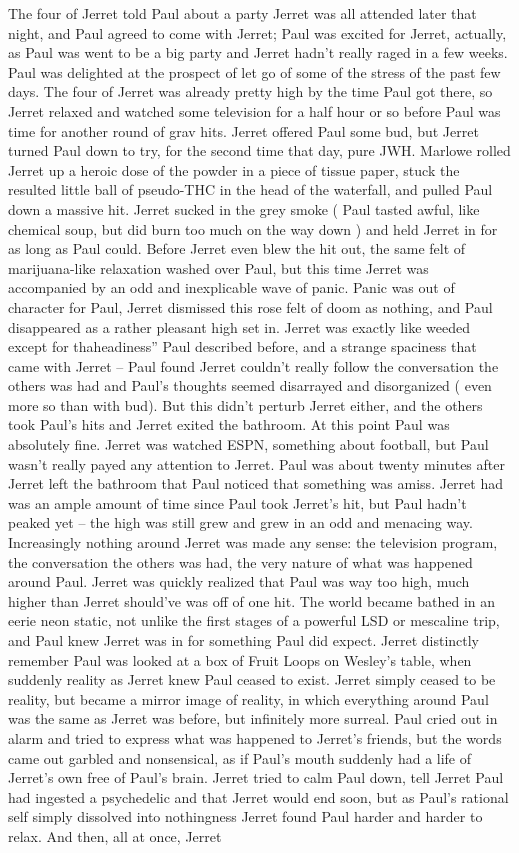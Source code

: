 \documentclass[12pt]{book}
\begin{document}
The four of Jerret told Paul about a party Jerret was all attended later that night, and Paul agreed to come with Jerret; Paul was excited for Jerret, actually, as Paul was went to be a big party and Jerret hadn't really raged in a few weeks. Paul was delighted at the prospect of let go of some of the stress of the past few days. The four of Jerret was already pretty high by the time Paul got there, so Jerret relaxed and watched some television for a half hour or so before Paul was time for another round of grav hits. Jerret offered Paul some bud, but Jerret turned Paul down to try, for the second time that day, pure JWH. Marlowe rolled Jerret up a heroic dose of the powder in a piece of tissue paper, stuck the resulted little ball of pseudo-THC in the head of the waterfall, and pulled Paul down a massive hit. Jerret sucked in the grey smoke ( Paul tasted awful, like chemical soup, but did burn too much on the way down ) and held Jerret in for as long as Paul could. Before Jerret even blew the hit out, the same felt of marijuana-like relaxation washed over Paul, but this time Jerret was accompanied by an odd and inexplicable wave of panic. Panic was out of character for Paul, Jerret dismissed this rose felt of doom as nothing, and Paul disappeared as a rather pleasant high set in. Jerret was exactly like weeded except for thaheadiness'' Paul described before, and a strange spaciness that came with Jerret -- Paul found Jerret couldn't really follow the conversation the others was had and Paul's thoughts seemed disarrayed and disorganized ( even more so than with bud). But this didn't perturb Jerret either, and the others took Paul's hits and Jerret exited the bathroom. At this point Paul was absolutely fine. Jerret was watched ESPN, something about football, but Paul wasn't really payed any attention to Jerret. Paul was about twenty minutes after Jerret left the bathroom that Paul noticed that something was amiss. Jerret had was an ample amount of time since Paul took Jerret's hit, but Paul hadn't peaked yet -- the high was still grew and grew in an odd and menacing way. Increasingly nothing around Jerret was made any sense: the television program, the conversation the others was had, the very nature of what was happened around Paul. Jerret was quickly realized that Paul was way too high, much higher than Jerret should've was off of one hit. The world became bathed in an eerie neon static, not unlike the first stages of a powerful LSD or mescaline trip, and Paul knew Jerret was in for something Paul did expect. Jerret distinctly remember Paul was looked at a box of Fruit Loops on Wesley's table, when suddenly reality as Jerret knew Paul ceased to exist. Jerret simply ceased to be reality, but became a mirror image of reality, in which everything around Paul was the same as Jerret was before, but infinitely more surreal. Paul cried out in alarm and tried to express what was happened to Jerret's friends, but the words came out garbled and nonsensical, as if Paul's mouth suddenly had a life of Jerret's own free of Paul's brain. Jerret tried to calm Paul down, tell Jerret Paul had ingested a psychedelic and that Jerret would end soon, but as Paul's rational self simply dissolved into nothingness Jerret found Paul harder and harder to relax. And then, all at once, Jerret 
\end{document}
